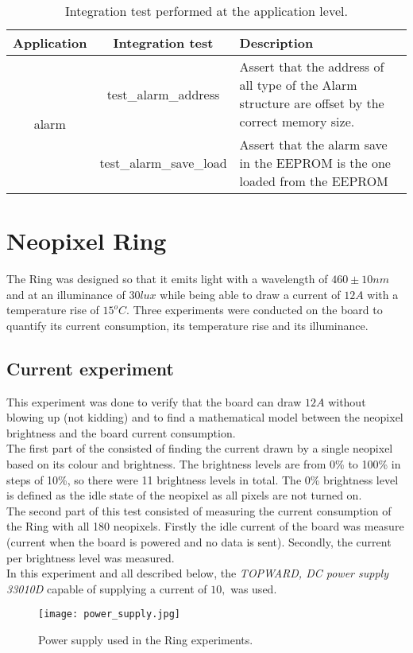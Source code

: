 \begin{table}[h!]
	\centering
	\caption{Integration test performed at the application level.}
	\label{table:integrationTest}
	\begin{tabular}{ccp{18em}}
		\hline
		\toprule
		\textbf{Application} & \textbf{Integration test} & \textbf{Description}\\
		\bottomrule
		\toprule
		\multirow{6}{*}{alarm} & test\_alarm\_address & Assert that the address of all type of the Alarm structure are offset by the correct memory size.\\
		& test\_alarm\_save\_load & Assert that the alarm save in the EEPROM is the one loaded from the EEPROM\\ 
		\bottomrule
		\hline
	\end{tabular}
\end{table}

\section{Neopixel Ring}
The Ring was designed so that it emits light with a wavelength of $460\pm 10nm$ and at an illuminance of  $30lux$ while being able to draw a current of $12A$ with a temperature rise of $15^oC$. Three experiments were conducted on the board to quantify its current consumption, its temperature rise and its illuminance.  

\subsection{Current experiment}
This experiment was done to verify that the board can draw $12A$ without blowing up (not kidding) and to find a mathematical model between the neopixel brightness and the board current consumption.\\
The first part of the consisted of finding the current drawn by a single neopixel based on its colour and brightness. The brightness levels are from 0\% to 100\% in steps of 10\%, so there were 11 brightness levels in total. The 0\% brightness level is defined as the idle state of the neopixel as all pixels are not turned on.\\
The second part of this test consisted of measuring the current consumption of the Ring with all 180 neopixels. Firstly the idle current of the board was measure (current when the board is powered and no data is sent). Secondly, the current per brightness level was measured.\\
In this experiment and all described below, the \textit{TOPWARD, DC power supply 33010D} capable of supplying a current of $10,$ was used.
\begin{figure}[ht]
	\centering
	\texttt{[image: power\_supply.jpg]}
	\caption{Power supply used in the Ring experiments.}
	\label{fig:power_supply}
\end{figure}
